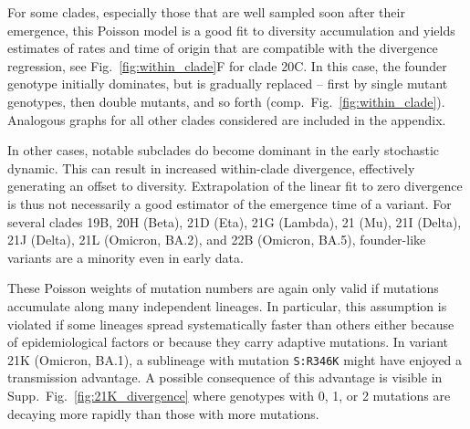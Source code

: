 \documentclass[aps,rmp, twocolumn]{revtex4}
\begin{document}
For some clades, especially those that are well sampled soon after their emergence, this Poisson model is a good fit to diversity accumulation and yields estimates of rates and time of origin that are compatible with the divergence regression, see Fig.~\ref{fig:within_clade}F for clade 20C.
In this case, the founder genotype initially dominates, but is gradually replaced -- first by single mutant genotypes, then double mutants, and so forth (comp.~Fig.~\ref{fig:within_clade}).
Analogous graphs for all other clades considered are included in the appendix.

In other cases, notable subclades do become dominant in the early stochastic dynamic.
This can result in increased within-clade divergence, effectively generating an offset to diversity.
Extrapolation of the linear fit to zero divergence is thus not necessarily a good estimator of the emergence time of a variant.
For several clades 19B, 20H (Beta), 21D (Eta), 21G (Lambda), 21 (Mu), 21I (Delta), 21J (Delta), 21L (Omicron, BA.2), and 22B (Omicron, BA.5), founder-like variants are a minority even in early data.

These Poisson weights of mutation numbers are again only valid if mutations accumulate along many independent lineages.
In particular, this assumption is violated if some lineages spread systematically faster than others either because of epidemiological factors or because they carry adaptive mutations.
In variant 21K (Omicron, BA.1), a sublineage with mutation \texttt{S:R346K} might have enjoyed a transmission advantage.
A possible consequence of this advantage is visible in Supp.~Fig.~\ref{fig:21K_divergence} where genotypes with 0, 1, or 2 mutations are decaying more rapidly than those with more mutations.
\end{document}
